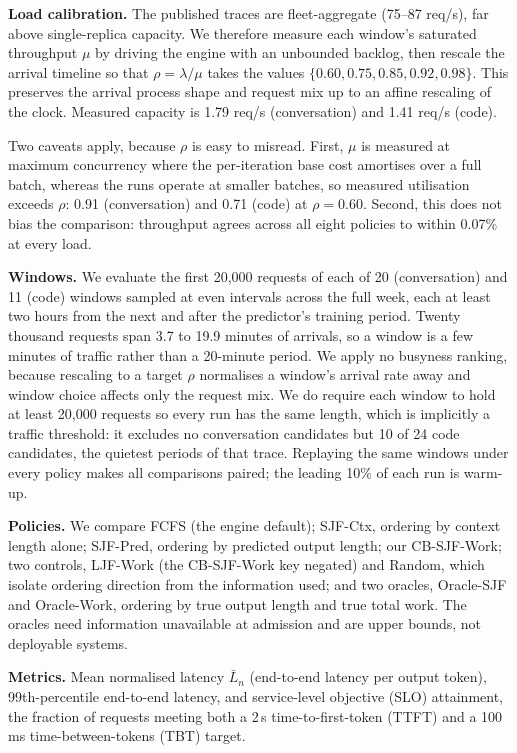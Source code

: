 \documentclass[conference,10pt,letterpaper]{IEEEtran}
\begin{document}
\textbf{Load calibration.} The published traces are fleet-aggregate (75--87
req/s), far above single-replica capacity. We therefore measure each window's
saturated throughput $\mu$ by driving the engine with an unbounded backlog, then
rescale the arrival timeline so that $\rho = \lambda/\mu$ takes the values
$\{0.60, 0.75, 0.85, 0.92, 0.98\}$. This preserves the arrival process shape and
request mix up to an affine rescaling of the clock. Measured capacity is 1.79
req/s (conversation) and 1.41 req/s (code).

Two caveats apply, because $\rho$ is easy to misread. First, $\mu$ is measured at
maximum concurrency where the per-iteration base cost amortises over a full
batch, whereas the runs operate at smaller batches, so measured utilisation
exceeds $\rho$: 0.91 (conversation) and 0.71 (code) at
$\rho=0.60$. Second, this
does not bias the comparison: throughput agrees across all eight policies to
within 0.07\% at every load.

\textbf{Windows.} We evaluate the first 20{,}000 requests of each of 20
(conversation) and 11 (code) windows sampled at even intervals across the full
week, each at least two hours from the next and after the predictor's training
period. Twenty thousand requests span 3.7 to 19.9 minutes of arrivals, so a
window is a few minutes of traffic rather than a 20-minute period. We apply no
busyness ranking, because rescaling to a target $\rho$ normalises a window's
arrival rate away and window choice affects only the request mix. We do require
each window to hold at least 20{,}000 requests so every run has the same length,
which is implicitly a traffic threshold: it excludes no conversation candidates
but 10 of 24 code candidates, the quietest periods of that trace. Replaying the
same windows under every policy makes all comparisons paired; the leading 10\%
of each run is warm-up.

\textbf{Policies.} We compare FCFS (the engine default); SJF-Ctx, ordering by
context length alone; SJF-Pred, ordering by predicted output length; our
CB-SJF-Work; two controls, LJF-Work (the CB-SJF-Work key negated) and Random,
which isolate ordering direction from the information used; and two oracles,
Oracle-SJF and Oracle-Work, ordering by true output length and true total work.
The oracles need information unavailable at admission and are upper bounds, not
deployable systems.

\textbf{Metrics.} Mean normalised latency $\bar{L}_n$ (end-to-end latency per
output token), 99th-percentile end-to-end latency, and service-level objective (SLO) attainment, the
fraction of requests meeting both a 2\,s time-to-first-token (TTFT) and a 100\,ms
time-between-tokens (TBT) target.
\end{document}
